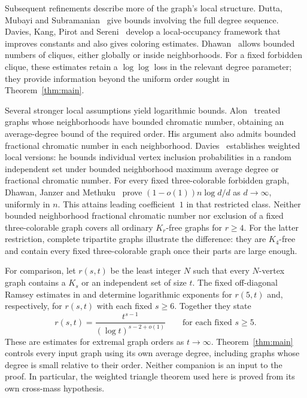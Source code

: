 Subsequent refinements describe more of the graph's local structure.
Dutta, Mubayi and Subramanian~\cite{DMS2012} give bounds involving
the full degree sequence. Davies, Kang, Pirot and
Sereni~\cite[Theorem~30 and Corollary~31]{DKPS2020} develop a local-occupancy
framework that improves constants and also gives coloring estimates.
Dhawan~\cite[Theorems~1.3 and~1.4]{DhawanLocallySparse2026} allows bounded
numbers of cliques, either globally or inside neighborhoods.
For a fixed forbidden clique, these estimates retain a $\log\log$
loss in the relevant degree parameter; they provide information beyond
the uniform order sought in Theorem~\ref{thm:main}.

Several stronger local assumptions yield logarithmic bounds.
Alon~\cite[Theorem~1.1 and the remark following its proof]{Alon1996}
treated graphs whose neighborhoods have
bounded chromatic number, obtaining an average-degree bound of the
required order. His argument also admits bounded fractional chromatic
number in each neighborhood. Davies~\cite[Theorems~1 and~3]{Davies2026}
establishes weighted local versions: he bounds individual vertex
inclusion probabilities in a random independent set under bounded
neighborhood maximum average degree or fractional chromatic number.
For every fixed three-colorable forbidden graph, Dhawan, Janzer and
Methuku~\cite[Theorems~1.4 and~1.6]{DJM2025} prove
$(1-o(1))n\log d/d$ as $d\to\infty$, uniformly in $n$.
This attains leading coefficient~$1$ in that restricted class.
Neither bounded neighborhood fractional chromatic number nor exclusion of a fixed
three-colorable graph covers all ordinary $K_r$-free graphs for $r\ge4$.
For the latter restriction, complete tripartite graphs illustrate the
difference: they are $K_4$-free and contain every fixed three-colorable
graph once their parts are large enough.

For comparison, let $r(s,t)$ be the least integer $N$ such that every
$N$-vertex graph contains a $K_s$ or an independent set of size $t$.
The fixed off-diagonal Ramsey estimates in
\cite[Theorem~1.1]{RamseyFive} and \cite[Theorem~1.1]{RamseyFixed}
determine logarithmic exponents for $r(5,t)$ and, respectively,
for $r(s,t)$ with each fixed $s\ge6$.
Together they state
\[
 r(s,t)=\frac{t^{s-1}}{(\log t)^{s-2+o(1)}}
 \qquad\text{for each fixed }s\ge5.
\]
These are estimates for extremal graph orders as $t\to\infty$.
Theorem~\ref{thm:main} controls every input graph using its own average
degree, including graphs whose degree is small relative to their order.
Neither companion is an input to the proof. In particular, the weighted
triangle theorem used here is proved from its own cross-mass hypothesis.


